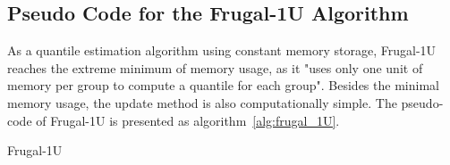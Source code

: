\subsection{Pseudo Code for the Frugal-1U Algorithm}

As a quantile estimation algorithm using constant memory storage, Frugal-1U reaches the extreme minimum of memory usage, as it "uses only one unit of memory per group to compute a quantile for each group"\cite{maFrugalStreamingEstimating2014}. Besides the minimal memory usage, the update method is also computationally simple. The pseudo-code of Frugal-1U is presented as algorithm~\ref{alg:frugal_1U}.
\begin{algorithm}
\caption{Frugal-1U}\label{alg:frugal_1U}
    \begin{algorithmic}[1]
                \EndIf
            \EndFor
    \end{algorithmic}
\end{algorithm}

